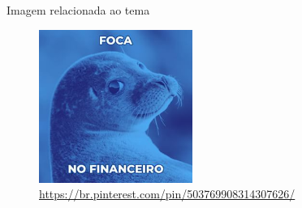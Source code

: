 \documentclass[11pt]{beamer}
\begin{document}
	\begin{frame}{Imagem relacionada ao tema}
		\begin{figure}
			\includegraphics[width=5cm]{./foca_financeiro.jpg}
			\caption{\url{https://br.pinterest.com/pin/503769908314307626/}}
		\end{figure}
	\end{frame}
\end{document}
